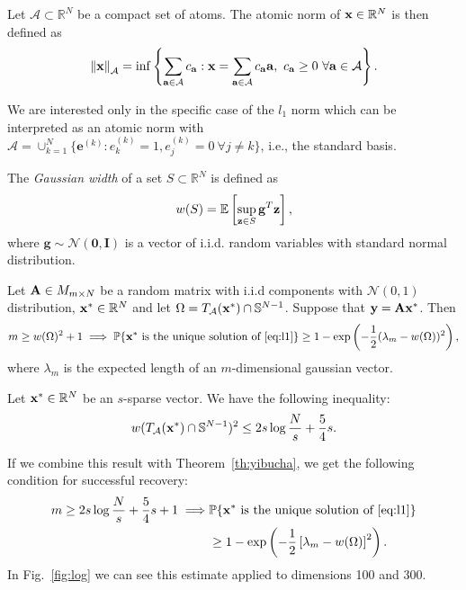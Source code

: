 \begin{definition}
    Let $\mathcal{A} \subset \mathbb{R}^{N}$ be a compact set of atoms.
    The atomic norm of $\mathbf{x} \in \mathbb{R}^N$ is then defined as
    \[ \left\Vert\mathbf{x}\right\Vert_\mathcal{A} = \inf \left\{  \sum_{\mathbf{a} \in \mathcal{A}}c_\mathbf{a}:
                                        \mathbf{x} = \sum_{\mathbf{a} \in \mathcal{A}}c_\mathbf{a} \mathbf{a},
        ~c_\mathbf{a} \geq 0 \ \forall\mathbf{a} \in \mathcal{A} \right\}. \]
\end{definition}

We are interested only in the specific case of the $l_1$ norm which can be interpreted as an atomic norm with
$\mathcal{A} = \cup_{k=1}^N \{ \mathbf{e}^{(k)}: e^{(k)}_k = 1, e^{(k)}_j = 0 \ \forall j \neq k \}$, i.e., the standard basis.

\begin{definition}
    The \textit{Gaussian width} of a set $S \subset \mathbb{R}^N$ is defined as
    \[ w(S) = \mathbb{E} \left[ \sup_{\mathbf{z} \in S} \mathbf{g}^T \mathbf{z} \right], \]
    where $\mathbf{g} \sim \mathcal{N}(\mathbf{0}, \mathbf{I})$ is a vector of i.i.d. random variables with standard normal distribution.
\end{definition}

\begin{theorem}\label{th:yibucha}
    Let $\mathbf{A} \in M_{m \times N}$ be a random matrix with i.i.d components with $\mathcal{N}(0, 1)$ distribution,
    $\mathbf{x}^* \in \mathbb{R}^N$ and let $\Omega = T_{\mathcal{A}}(\mathbf{x}^*) \cap \mathbb{S}^{N-1}$.
    Suppose that $\mathbf{y} = \mathbf{A} \mathbf{x}^*$.
    Then
    \[ m \geq w(\Omega)^2 + 1 \implies \mathbb{P}\{ \mathbf{x}^* \text{ is the unique solution of \ref{eq:l1}} \} \geq
    1-\exp\left(-\frac{1}{2}(\lambda_m - w(\Omega))^2\right),\]
    where $\lambda_m$ is the expected length of an $m$-dimensional gaussian vector.
\end{theorem}

\begin{proposition}
    Let $\mathbf{x}^* \in \mathbb{R}^N$ be an $s$-sparse vector.
    We have the following inequality:
    \[ w(T_{\mathcal{A}}(\mathbf{x}^*)\cap \mathbb{S}^{N-1})^2 \leq 2s \log \frac{N}{s} + \frac{5}{4}s.\]
\end{proposition}
If we combine this result with Theorem~\ref{th:yibucha}, we get the following condition for successful recovery:
\begin{align}
     m \geq 2s\log \frac{N}{s} + \frac{5}{4}s + 1 \implies &\mathbb{P}\{\mathbf{x}^* \text{ is the unique solution of \ref{eq:l1}}\} \nonumber \\
    & \geq 1 - \exp \left( - \frac{1}{2} \left[\lambda_m - w(\Omega)\right]^2 \right) \label{eq:log}.
\end{align}
In Fig.~\ref{fig:log} we can see this estimate applied to dimensions 100 and 300.


